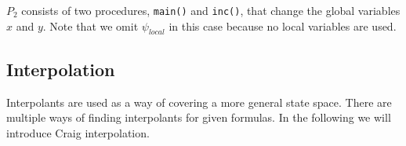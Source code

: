 \documentclass{article}
\newcommand\mycom[1]{}
\newcommand\mycom[1]{#1}
\newcommand{\WidestEntry}{$\psi_{global}$}%
\newcommand{\SetToWidest}[1]{\makebox[\widthof{\WidestEntry}]{$#1$}}%
\newcommand{\jw}[1]{\mycom{\todo[color=blue!40,inline]{\small JW: #1}}}
\begin{document}
\begin{minipage}{.6\textwidth}
		\label{fig:rect}
	\end{minipage}%
	
	\pagebreak
	$P_2$ consists of two procedures, \texttt{main()} and \texttt{inc()}, that change the global variables $x$ and $y$. Note that we omit $\psi_{local}$ in this case because no local variables are used.
	\jw{more details + example with local vars.}
	
	
	\pagebreak
	
	
	\subsection{Interpolation}
	Interpolants are used as a way of covering a more general state space. There are multiple ways of finding interpolants for given formulas.
	In the following we will introduce Craig interpolation. 
	\jw{citation needed}
	
\end{document}
